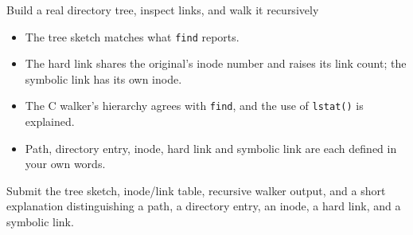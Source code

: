 \begin{labproject}{Build a real directory tree, inspect links, and walk it recursively}
\begin{verification}
\begin{itemize}
  \item The tree sketch matches what \texttt{find} reports.
  \item The hard link shares the original's inode number and raises its link count; the symbolic link has its own inode.
  \item The C walker's hierarchy agrees with \texttt{find}, and the use of \texttt{lstat()} is explained.
  \item Path, directory entry, inode, hard link and symbolic link are each defined in your own words.
\end{itemize}
\end{verification}

\begin{labdeliverable}
Submit the tree sketch, inode/link table, recursive walker output, and a short explanation distinguishing a path, a directory entry, an inode, a hard link, and a symbolic link.
\end{labdeliverable}
\end{labproject}
